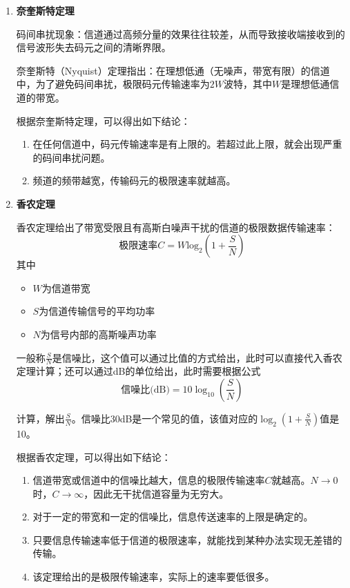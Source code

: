 \documentclass[12pt, a4paper, oneside]{ctexart}
\begin{document}
\begin{enumerate}
    \item {\bf 奈奎斯特定理}
    
    码间串扰现象：信道通过高频分量的效果往往较差，从而导致接收端接收到的信号波形失去码元之间的清晰界限。

    奈奎斯特（Nyquist）定理指出：在理想低通（无噪声，带宽有限）的信道中，为了避免码间串扰，极限码元传输速率为$2W$波特，其中$W$是理想低通信道的带宽。

    根据奈奎斯特定理，可以得出如下结论：
    \begin{enumerate}
        \item 在任何信道中，码元传输速率是有上限的。若超过此上限，就会出现严重的码间串扰问题。
        \item 频道的频带越宽，传输码元的极限速率就越高。
    \end{enumerate}

    \item {\bf 香农定理}
    
    香农定理给出了带宽受限且有高斯白噪声干扰的信道的极限数据传输速率：
    \begin{equation}
        \text{极限速率}C=W\text{log}_2(1+\frac{S}{N})
    \end{equation}
    其中
    \begin{itemize}
        \item $W$为信道带宽
        \item $S$为信道传输信号的平均功率
        \item $N$为信号内部的高斯噪声功率
    \end{itemize}

    一般称$\frac{S}{N}$是信噪比，这个值可以通过比值的方式给出，此时可以直接代入香农定理计算；还可以通过dB的单位给出，此时需要根据公式
    \begin{equation}
        \text{信噪比(dB)}=10\log_{10} (\frac{S}{N})
    \end{equation}

    计算，解出$\frac{S}{N}$。信噪比30dB是一个常见的值，该值对应的$\log_2 (1+\frac{S}{N})$值是10。

    根据香农定理，可以得出如下结论：
    \begin{enumerate}
        \item 信道带宽或信道中的信噪比越大，信息的极限传输速率$C$就越高。$N\to 0$时，$C\to\infty$，因此无干扰信道容量为无穷大。
        \item 对于一定的带宽和一定的信噪比，信息传送速率的上限是确定的。
        \item 只要信息传输速率低于信道的极限速率，就能找到某种办法实现无差错的传输。
        \item 该定理给出的是极限传输速率，实际上的速率要低很多。
    \end{enumerate}
\end{enumerate}
\end{document}
